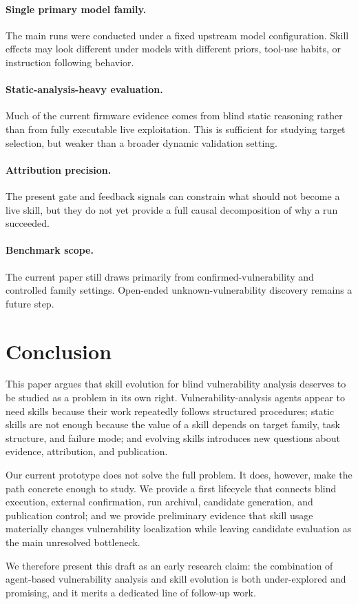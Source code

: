 \documentclass[11pt]{article}
\begin{document}
\paragraph{Single primary model family.}
The main runs were conducted under a fixed upstream model configuration.  Skill effects
may look different under models with different priors, tool-use habits, or instruction
following behavior.

\paragraph{Static-analysis-heavy evaluation.}
Much of the current firmware evidence comes from blind static reasoning rather than from
fully executable live exploitation.  This is sufficient for studying target selection,
but weaker than a broader dynamic validation setting.

\paragraph{Attribution precision.}
The present gate and feedback signals can constrain what should not become a live skill,
but they do not yet provide a full causal decomposition of why a run succeeded.

\paragraph{Benchmark scope.}
The current paper still draws primarily from confirmed-vulnerability and controlled
family settings.  Open-ended unknown-vulnerability discovery remains a future step.

\section{Conclusion}
\label{sec:conclusion}

This paper argues that skill evolution for blind vulnerability analysis deserves to be
studied as a problem in its own right.  Vulnerability-analysis agents appear to need
skills because their work repeatedly follows structured procedures; static skills are not
enough because the value of a skill depends on target family, task structure, and
failure mode; and evolving skills introduces new questions about evidence, attribution,
and publication.

Our current prototype does not solve the full problem.  It does, however, make the path
concrete enough to study.  We provide a first lifecycle that connects blind execution,
external confirmation, run archival, candidate generation, and publication control; and
we provide preliminary evidence that skill usage materially changes vulnerability
localization while leaving candidate evaluation as the main unresolved bottleneck.

We therefore present this draft as an early research claim: the combination of
agent-based vulnerability analysis and skill evolution is both under-explored and
promising, and it merits a dedicated line of follow-up work.



\end{document}
